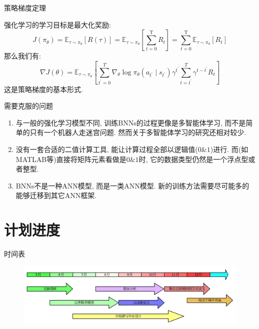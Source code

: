 \documentclass{beamer}
\begin{document}
\begin{frame}{策略梯度定理}
    \footnotesize
    \begin{thm}
        强化学习的学习目标是最大化奖励:
        \begin{equation}
            J\left(\pi_{\theta}\right)=\mathbb{E}_{\tau \sim \pi_{\theta}}[R(\tau)]=\mathbb{E}_{\tau \sim \pi_{\theta}}\left[\sum_{t=0}^{\mathrm{T}} R_{t}\right]=\sum_{t=0}^{\mathrm{T}} \mathbb{E}_{\tau \sim \pi_{\theta}}\left[R_{t}\right]
        \end{equation}
        那么我们有:
        \begin{equation}
            \nabla J(\theta)=\mathbb{E}_{\tau \sim \pi_{\theta}}\left[\sum_{t^{\prime}=0}^{T} \nabla_{\theta} \log \pi_{\theta}\left(a_{t^{\prime}} \mid s_{t^{\prime}}\right) \gamma^{t^{\prime}} \sum_{t=t^{\prime}}^{T} \gamma^{t-t^{\prime}} R_{t}\right]
        \end{equation}
        这是策略梯度的基本形式.
    \end{thm}
    
\end{frame}

\begin{frame}{需要克服的问题}
    \footnotesize
    \begin{enumerate}
        \item 与一般的强化学习模型不同, 训练BNNs的过程更像是多智能体学习, 而不是简单的只有一个机器人走迷宫问题. 然而关于多智能体学习的研究还相对较少.
        \item 没有一套合适的二值计算工具, 能让计算过程全部以逻辑值($0\&1$)进行. 而(如MATLAB等)直接将矩阵元素看做是$0\&1$时, 它的数据类型仍然是一个浮点型或者整型.
        \item BNNs不是一种ANN模型, 而是一类ANN模型. 新的训练方法需要尽可能多的能够迁移到其它ANN框架.
    \end{enumerate}
\end{frame}

\section{计划进度}

\begin{frame}{时间表}
    \begin{figure}
        \centering
        \includegraphics[scale=0.2]{pic/mytime.pdf}
    \end{figure}
\end{frame}
\end{document}
